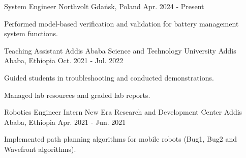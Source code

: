 

\begin{cventries}

  \cventry
    {System Engineer} %
    {Northvolt} %
    {Gda{\.n}sk, Poland} %
    {Apr. 2024 - Present} %
    {
      \begin{cvitems} %
        \item {Performed model-based verification and validation for battery management system functions.}
      \end{cvitems}
    }

  \cventry
    {Teaching Assistant} %
    {Addis Ababa Science and Technology University} %
    {Addis Ababa, Ethiopia} %
    {Oct. 2021 - Jul. 2022} %
    {
      \begin{cvitems} %
        \item {Guided students in troubleshooting and conducted demonstrations.}
        \item {Managed lab resources and graded lab reports.}
      \end{cvitems}
    }

  \cventry
    {Robotics Engineer Intern} %
    {New Era Research and Development Center} %
    {Addis Ababa, Ethiopia} %
    {Apr. 2021 - Jun. 2021} %
    {
      \begin{cvitems} %
        \item {Implemented path planning algorithms for mobile robots (Bug1, Bug2 and Wavefront algorithms).}
      \end{cvitems}
    }

\end{cventries}
